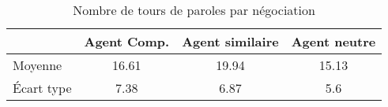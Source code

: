 \begin{appendix}

\begin{table}[b]
	\caption{Nombre de tours de paroles par négociation} 
	\centering
	
	\begin{tabular}{ l c c c }
		\hline
		\textbf{ }& \textbf{Agent Comp.} & \textbf{Agent similaire} & \textbf{Agent neutre} \\ 
		\hline
		\newline Moyenne & 16.61& 19.94 & 15.13 \\
		\newline Écart type & 7.38 & 6.87 & 5.6 \\
		\hline
		
	\end{tabular}
	
	\label{tab:tour}
\end{table}
\end{appendix}